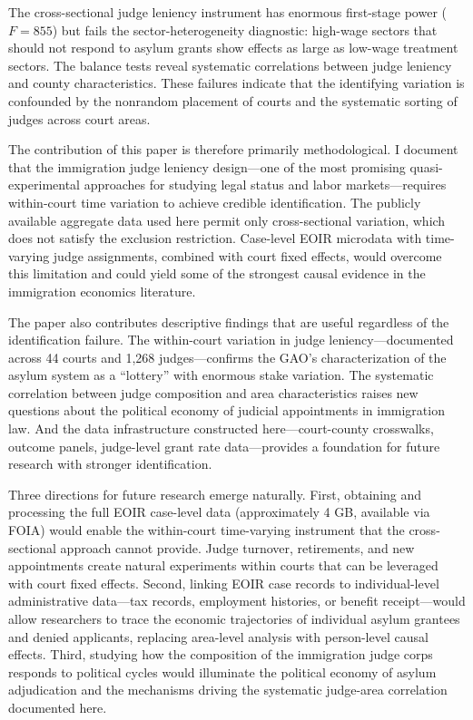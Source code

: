 \documentclass[12pt]{article}
\begin{document}
The cross-sectional judge leniency instrument has enormous first-stage power ($F = 855$) but fails the sector-heterogeneity diagnostic: high-wage sectors that should not respond to asylum grants show effects as large as low-wage treatment sectors. The balance tests reveal systematic correlations between judge leniency and county characteristics. These failures indicate that the identifying variation is confounded by the nonrandom placement of courts and the systematic sorting of judges across court areas.

The contribution of this paper is therefore primarily methodological. I document that the immigration judge leniency design---one of the most promising quasi-experimental approaches for studying legal status and labor markets---requires within-court time variation to achieve credible identification. The publicly available aggregate data used here permit only cross-sectional variation, which does not satisfy the exclusion restriction. Case-level EOIR microdata with time-varying judge assignments, combined with court fixed effects, would overcome this limitation and could yield some of the strongest causal evidence in the immigration economics literature.

The paper also contributes descriptive findings that are useful regardless of the identification failure. The within-court variation in judge leniency---documented across 44 courts and 1,268 judges---confirms the GAO's characterization of the asylum system as a ``lottery'' with enormous stake variation. The systematic correlation between judge composition and area characteristics raises new questions about the political economy of judicial appointments in immigration law. And the data infrastructure constructed here---court-county crosswalks, outcome panels, judge-level grant rate data---provides a foundation for future research with stronger identification.

Three directions for future research emerge naturally. First, obtaining and processing the full EOIR case-level data (approximately 4 GB, available via FOIA) would enable the within-court time-varying instrument that the cross-sectional approach cannot provide. Judge turnover, retirements, and new appointments create natural experiments within courts that can be leveraged with court fixed effects. Second, linking EOIR case records to individual-level administrative data---tax records, employment histories, or benefit receipt---would allow researchers to trace the economic trajectories of individual asylum grantees and denied applicants, replacing area-level analysis with person-level causal effects. Third, studying how the composition of the immigration judge corps responds to political cycles would illuminate the political economy of asylum adjudication and the mechanisms driving the systematic judge-area correlation documented here.
\end{document}
